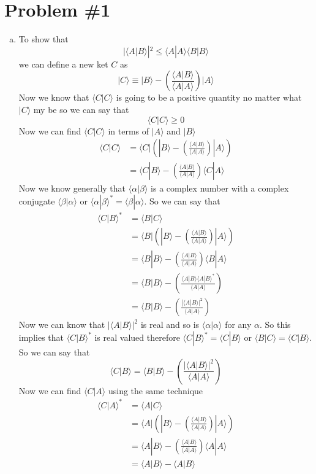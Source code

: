 \documentclass[11pt]{article}
\numberwithin{equation}{section}
\newcommand{\ket}[1]{|{#1}\rangle}
\newcommand{\bra}[1]{\langle{#1}|}
\newcommand{\norm}[2]{\langle{#1}|{#2}\rangle}
\begin{document}


\section{Problem \#1}
\begin{enumerate}[(a)]
\item
To show that 
$$|\norm{A}{B}|^2\le\norm{A}{A}\norm{B}{B}$$
we can define a new ket $C$ as
$$\ket{C}\equiv\ket{B}-\left(\frac{\norm{A}{B}}{\norm{A}{A}}\right)\ket{A}$$
Now we know that $\norm{C}{C}$ is going to be a positive quantity no matter what $\ket{C}$ my be so we can say that
$$\norm{C}{C}\ge 0$$
Now we can find $\norm{C}{C}$ in terms of $\ket{A}$ and $\ket{B}$
\begin{align*}
\norm{C}{C} &=\bra{C}\left(\ket{B}-\left(\frac{\norm{A}{B}}{\norm{A}{A}}\right)\ket{A}\right)\\
&=\norm{C}{B}-\left(\frac{\norm{A}{B}}{\norm{A}{A}}\right)\norm{C}{A}
\end{align*}
Now we know generally that $\norm{\alpha}{\beta}$ is a complex number with a complex conjugate $\norm{\beta}{\alpha}$ or $\norm{\alpha}{\beta}^*=\norm{\beta}{\alpha}$. So we can say that
\begin{align*}
\norm{C}{B}^* &= \norm{B}{C}\\
&= \bra{B}\left(\ket{B}-\left(\frac{\norm{A}{B}}{\norm{A}{A}}\right)\ket{A}\right)\\
&= \norm{B}{B}-\left(\frac{\norm{A}{B}}{\norm{A}{A}}\right)\norm{B}{A}\\
&= \norm{B}{B}-\left(\frac{\norm{A}{B}\norm{A}{B}^*}{\norm{A}{A}}\right)\\
&= \norm{B}{B}-\left(\frac{|\norm{A}{B}|^2}{\norm{A}{A}}\right)
\end{align*}
Now we can know that $|\norm{A}{B}|^2$ is real and so is $\norm{\alpha}{\alpha}$ for any $\alpha$. So this implies that $\norm{C}{B}^*$ is real valued therefore $\norm{C}{B}^* = \norm{C}{B}$ or $\norm{B}{C} = \norm{C}{B}$. So we can say that 
$$\norm{C}{B} = \norm{B}{B}-\left(\frac{|\norm{A}{B}|^2}{\norm{A}{A}}\right)$$
Now we can find $\norm{C}{A}$ using the same technique 
\begin{align*}
\norm{C}{A}^* &= \norm{A}{C}\\
&= \bra{A}\left(\ket{B}-\left(\frac{\norm{A}{B}}{\norm{A}{A}}\right)\ket{A}\right)\\
&= \norm{A}{B}-\left(\frac{\norm{A}{B}}{\norm{A}{A}}\right)\norm{A}{A}\\
&= \norm{A}{B}-\norm{A}{B}\\

\end{align*}
\end{enumerate}
\end{document}
